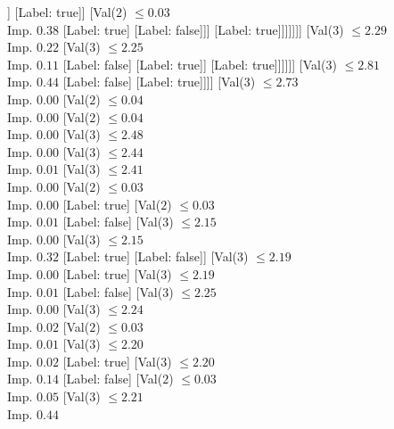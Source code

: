 \documentclass[margin=10pt]{standalone}
\begin{document}
\begin{forest}
																				]
																			[Label: true]]
																		[Val($2$) $ \leq 0.03$ \\ Imp. $0.38$
																			[Label: true]
																			[Label: false]]]
																	[Label: true]]]]]]]
											[Val($3$) $ \leq 2.29$ \\ Imp. $0.22$
												[Val($3$) $ \leq 2.25$ \\ Imp. $0.11$
													[Label: false]
													[Label: true]]
												[Label: true]]]]]]
							[Val($3$) $ \leq 2.81$ \\ Imp. $0.44$
								[Label: false]
								[Label: true]]]]
					[Val($3$) $ \leq 2.73$ \\ Imp. $0.00$
						[Val($2$) $ \leq 0.04$ \\ Imp. $0.00$
							[Val($2$) $ \leq 0.04$ \\ Imp. $0.00$
								[Val($3$) $ \leq 2.48$ \\ Imp. $0.00$
									[Val($3$) $ \leq 2.44$ \\ Imp. $0.01$
										[Val($3$) $ \leq 2.41$ \\ Imp. $0.00$
											[Val($2$) $ \leq 0.03$ \\ Imp. $0.00$
												[Label: true]
												[Val($2$) $ \leq 0.03$ \\ Imp. $0.01$
													[Label: false]
													[Val($3$) $ \leq 2.15$ \\ Imp. $0.00$
														[Val($3$) $ \leq 2.15$ \\ Imp. $0.32$
															[Label: true]
															[Label: false]]
														[Val($3$) $ \leq 2.19$ \\ Imp. $0.00$
															[Label: true]
															[Val($3$) $ \leq 2.19$ \\ Imp. $0.01$
																[Label: false]
																[Val($3$) $ \leq 2.25$ \\ Imp. $0.00$
																	[Val($3$) $ \leq 2.24$ \\ Imp. $0.02$
																		[Val($2$) $ \leq 0.03$ \\ Imp. $0.01$
																			[Val($3$) $ \leq 2.20$ \\ Imp. $0.02$
																				[Label: true]
																				[Val($3$) $ \leq 2.20$ \\ Imp. $0.14$
																					[Label: false]
																					[Val($2$) $ \leq 0.03$ \\ Imp. $0.05$
																						[Val($3$) $ \leq 2.21$ \\ Imp. $0.44$

\end{forest}
\end{document}

